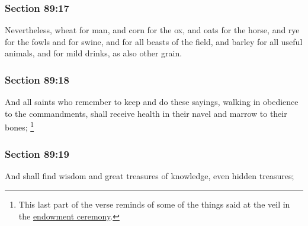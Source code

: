 	\subsubsection{Section 89:17} %
		\label{DC89-17}

		Nevertheless, wheat for man, and corn for the ox, and oats for the horse, and rye for the fowls and for swine, and for all beasts of the field, and barley for all useful animals, and for mild drinks, as also other grain.


	\subsubsection{Section 89:18} %
		\label{DC89-18}

		And all saints who remember to keep and do these sayings, walking in obedience to the commandments, shall receive health in their navel and marrow to their bones;%
			\footnote{%
				This last part of the verse reminds of some of the things said at the veil in the \hyperref[TEMPLE-ENDOWMENT-ENDOW-PRE-1990-PASSING]{endowment ceremony}.
				} 


	\subsubsection{Section 89:19} %
		\label{DC89-19}

		And shall find wisdom and great treasures of knowledge, even hidden treasures;


